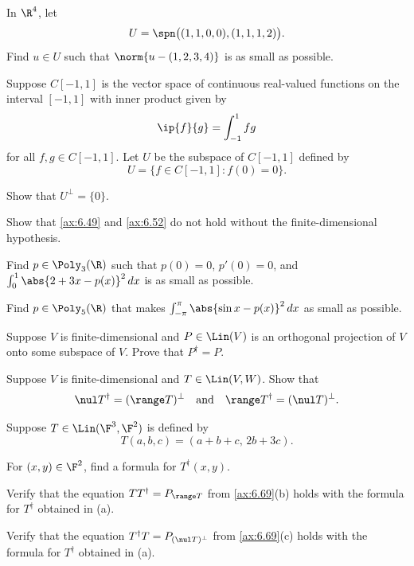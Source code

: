 \begin{exercise}
In $\R^4$, let
\[ U = \spn\bigl((1,1,0,0),(1,1,1,2)\bigr). \]
Find $u\in U$ such that $\norm{u-(1,2,3,4)}$ is as small as possible.
\end{exercise}

\begin{exercise}
Suppose $C[-1,1]$ is the vector space of continuous real-valued functions on
the interval $[-1,1]$ with inner product given by
\[ \ip{f}{g} = \int_{-1}^{1} fg \]
for all $f,g\in C[-1,1]$. Let $U$ be the subspace of $C[-1,1]$ defined by
\[ U = \{f\in C[-1,1] : f(0)=0\}. \]
\begin{parts}
\item Show that $U^\perp=\{0\}$.
\item Show that \ref{ax:6.49} and \ref{ax:6.52} do not hold without the
  finite-dimensional hypothesis.
\end{parts}
\end{exercise}

\begin{exercise}
Find $p\in\Poly_3(\R)$ such that $p(0)=0$, $p'(0)=0$, and
$\int_0^1\abs{2+3x-p(x)}^2\,dx$ is as small as possible.
\end{exercise}

\begin{exercise}
Find $p\in\Poly_5(\R)$ that makes $\int_{-\pi}^{\pi}\abs{\sin x-p(x)}^2\,dx$ as
small as possible.
\end{exercise}

\begin{exercise}
Suppose $V$ is finite-dimensional and $P\in\Lin(V)$ is an orthogonal projection
of $V$ onto some subspace of $V$. Prove that $P^\dagger=P$.
\end{exercise}

\begin{exercise}
Suppose $V$ is finite-dimensional and $T\in\Lin(V,W)$. Show that
\[ \nul T^\dagger = (\range T)^\perp \quad\text{and}\quad
   \range T^\dagger = (\nul T)^\perp. \]
\end{exercise}

\begin{exercise}
Suppose $T\in\Lin(\F^3,\F^2)$ is defined by
\[ T(a,b,c) = (a+b+c,\,2b+3c). \]
\begin{parts}
\item For $(x,y)\in\F^2$, find a formula for $T^\dagger(x,y)$.
\item Verify that the equation $TT^\dagger=P_{\range T}$ from
  \ref{ax:6.69}(b) holds with the formula for $T^\dagger$ obtained in (a).
\item Verify that the equation $T^\dagger T=P_{(\nul T)^\perp}$ from
  \ref{ax:6.69}(c) holds with the formula for $T^\dagger$ obtained in (a).
\end{parts}
\end{exercise}

